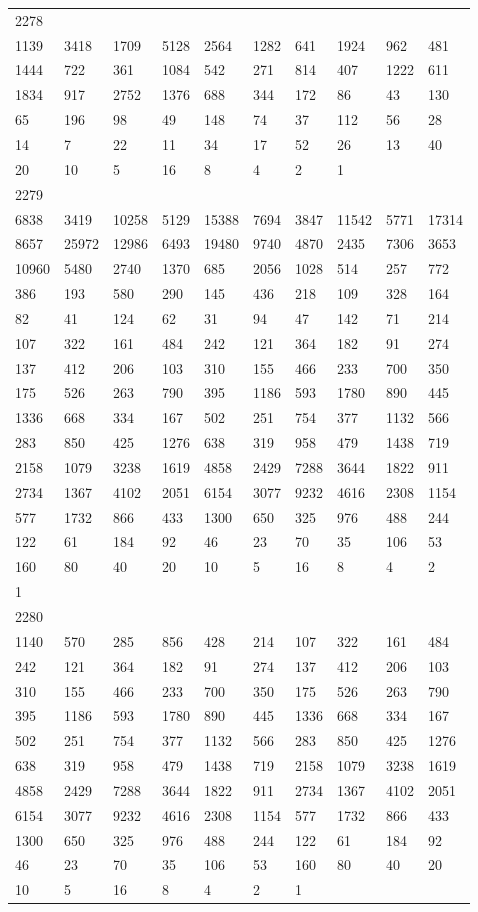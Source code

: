 \begin{longtable}{*{10}{l}}
2278&&&&&&&&&\\
1139& 3418& 1709& 5128& 2564& 1282& 641& 1924& 962& 481\\
1444& 722& 361& 1084& 542& 271& 814& 407& 1222& 611\\
1834& 917& 2752& 1376& 688& 344& 172& 86& 43& 130\\
65& 196& 98& 49& 148& 74& 37& 112& 56& 28\\
14& 7& 22& 11& 34& 17& 52& 26& 13& 40\\
20& 10& 5& 16& 8& 4& 2& 1& \\

2279&&&&&&&&&\\
6838& 3419& 10258& 5129& 15388& 7694& 3847& 11542& 5771& 17314\\
8657& 25972& 12986& 6493& 19480& 9740& 4870& 2435& 7306& 3653\\
10960& 5480& 2740& 1370& 685& 2056& 1028& 514& 257& 772\\
386& 193& 580& 290& 145& 436& 218& 109& 328& 164\\
82& 41& 124& 62& 31& 94& 47& 142& 71& 214\\
107& 322& 161& 484& 242& 121& 364& 182& 91& 274\\
137& 412& 206& 103& 310& 155& 466& 233& 700& 350\\
175& 526& 263& 790& 395& 1186& 593& 1780& 890& 445\\
1336& 668& 334& 167& 502& 251& 754& 377& 1132& 566\\
283& 850& 425& 1276& 638& 319& 958& 479& 1438& 719\\
2158& 1079& 3238& 1619& 4858& 2429& 7288& 3644& 1822& 911\\
2734& 1367& 4102& 2051& 6154& 3077& 9232& 4616& 2308& 1154\\
577& 1732& 866& 433& 1300& 650& 325& 976& 488& 244\\
122& 61& 184& 92& 46& 23& 70& 35& 106& 53\\
160& 80& 40& 20& 10& 5& 16& 8& 4& 2\\
1& \\

2280&&&&&&&&&\\
1140& 570& 285& 856& 428& 214& 107& 322& 161& 484\\
242& 121& 364& 182& 91& 274& 137& 412& 206& 103\\
310& 155& 466& 233& 700& 350& 175& 526& 263& 790\\
395& 1186& 593& 1780& 890& 445& 1336& 668& 334& 167\\
502& 251& 754& 377& 1132& 566& 283& 850& 425& 1276\\
638& 319& 958& 479& 1438& 719& 2158& 1079& 3238& 1619\\
4858& 2429& 7288& 3644& 1822& 911& 2734& 1367& 4102& 2051\\
6154& 3077& 9232& 4616& 2308& 1154& 577& 1732& 866& 433\\
1300& 650& 325& 976& 488& 244& 122& 61& 184& 92\\
46& 23& 70& 35& 106& 53& 160& 80& 40& 20\\
10& 5& 16& 8& 4& 2& 1& \\


\end{longtable}
